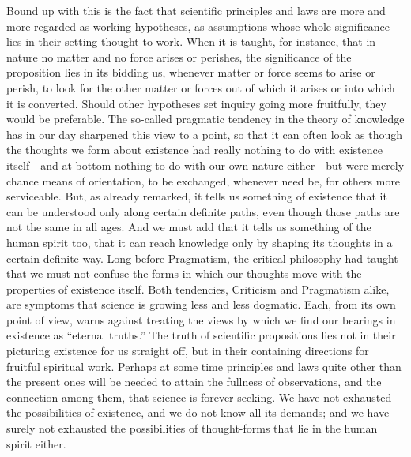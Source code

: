 \documentclass[12pt,a4paper]{article}
\newcommand{\opage}[1]{\marginnote{\footnotesize\textit{[#1]}}}
\begin{document}
Bound up with this is the fact that scientific principles and laws are more and more
regarded as working hypotheses, as assumptions whose whole significance lies in their
setting thought to work. When it is taught, for instance, that in nature no matter
and no force arises or perishes, the significance of the proposition lies in its
bidding us, whenever matter or force seems to arise or perish, to look for the other
matter or forces out of which it arises or into which it is converted. Should other
hypotheses set inquiry going more fruitfully, they would be preferable. The so-called
pragmatic tendency in the theory of knowledge has in our day sharpened this view to a
point, so that it can often look as though the thoughts we form about existence had
really nothing to do with existence itself---and at bottom nothing to do with our own
nature either---but were merely chance means of orientation, to be exchanged, whenever
need be, for others more serviceable. But, as already remarked, it tells us something
of existence that it can be understood only along certain definite paths, even though
those paths are not the same in all ages. And we must add that it tells us something
of the human spirit too, that it can reach knowledge only by shaping its thoughts in a
certain definite way. Long before Pragmatism, the critical philosophy had taught that
we must not confuse the forms in which our thoughts move with the properties of
existence itself. Both tendencies, Criticism and Pragmatism alike, are symptoms that
science is growing less and less dogmatic. Each, from \opage{44}its own point of view, warns
against treating the views by which we find our bearings in existence as ``eternal
truths.'' The truth of scientific propositions lies not in their picturing existence
for us straight off, but in their containing directions for fruitful spiritual work.
Perhaps at some time principles and laws quite other than the present ones will be
needed to attain the fullness of observations, and the connection among them, that
science is forever seeking. We have not exhausted the possibilities of existence, and
we do not know all its demands; and we have surely not exhausted the possibilities of
thought-forms that lie in the human spirit either.
\end{document}
